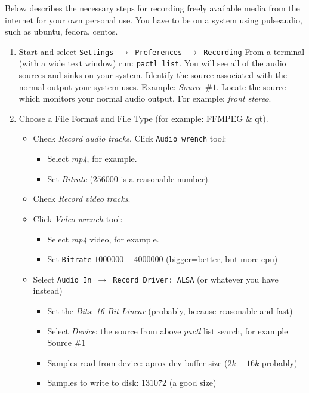 Below describes the necessary steps for recording freely available media from the internet for your own personal use.  You have to be on a system using pulseaudio, such as ubuntu, fedora, centos.

\begin{enumerate}
    \item Start \CGG{} and select \texttt{Settings $\rightarrow$ Preferences $\rightarrow$  Recording} From a terminal (with a wide text window) run: \texttt{pactl list}. You will see all of the audio sources and sinks on your system. Identify the source associated with the normal output your system uses. Example: \textit{Source $\#1$}. Locate the source which monitors your normal audio output.  For example: \textit{front stereo}.        
    \item Choose a File Format and File Type (for example: FFMPEG \& qt).
    \begin{itemize}
        \item Check \textit{Record audio tracks}.
        Click \texttt{Audio wrench} tool:
        \begin{itemize}
            \item Select \textit{mp4}, for example.
            \item Set \textit{Bitrate} ($256000$ is a reasonable number).
        \end{itemize}
        \item Check \textit{Record video tracks}.
        \item Click \textit{Video wrench} tool:
        \begin{itemize}
            \item Select \textit{mp4} video, for example.
            \item Set \texttt{Bitrate} $1000000 - 4000000$ (bigger=better, but more cpu)
        \end{itemize}
        \item Select \texttt{Audio In $\rightarrow$ Record Driver:  ALSA} (or whatever you have instead)
        \begin{itemize}
            \item Set the \textit{Bits}: \textit{16 Bit Linear} (probably, because reasonable and fast)
            \item Select \textit{Device}: the source from above \textit{pactl} list search, for example Source $\#1$
            \item Samples read from device: aprox dev buffer size ($2k-16k$ probably)
            \item Samples to write to disk: $131072$ (a good size)

\end{itemize}
\end{itemize}
\end{enumerate}
